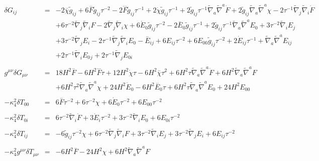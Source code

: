 \documentclass[10pt,letterpaper]{article}
\numberwithin{equation}{section}
\begin{document}
\begin{eqnarray}
\\  \nonumber\\ 
\delta G_{ij}&=& -2 \overset{..}{\chi} \tilde{g}_{ij} + 6 \overset{..}{F} \tilde{g}_{ij} \tau^{-2} - 2 \overset{...}{F} \tilde{g}_{ij} \tau^{-1} + 2 \dot{\chi} \tilde{g}_{ij} \tau^{-1} + 2 \tilde{g}_{ij} \tau^{-1} \tilde{\nabla}_{a}\tilde{\nabla}^{a}\dot{F} + 2 \tilde{g}_{ij} \tilde{\nabla}_{a}\tilde{\nabla}^{a}\chi - 2 \tau^{-1} \tilde{\nabla}_{j}\tilde{\nabla}_{i}\dot{F} \nonumber \\ 
&& + 6 \tau^{-2} \tilde{\nabla}_{j}\tilde{\nabla}_{i}F - 2 \tilde{\nabla}_{j}\tilde{\nabla}_{i}\chi +6 \dot{E}_{0}{} \tilde{g}_{ij} \tau^{-2} - 2 \overset{..}{E}_{0}{} \tilde{g}_{ij} \tau^{-1} + 2 \tilde{g}_{ij} \tau^{-1} \tilde{\nabla}_{a}\tilde{\nabla}^{a}E_{0}{} + 3 \tau^{-2} \tilde{\nabla}_{i}E_{j} \nonumber \\ 
&& + 3 \tau^{-2} \tilde{\nabla}_{j}E_{i} - 2 \tau^{-1} \tilde{\nabla}_{j}\tilde{\nabla}_{i}E_{0}{}- \overset{..}{E}_{ij} + 6 E_{ij} \tau^{-2} + 6 E_{00}{} \tilde{g}_{ij} \tau^{-2} + 2 \dot{E}_{ij} \tau^{-1} + \tilde{\nabla}_{a}\tilde{\nabla}^{a}E_{ij} \nonumber \\ 
&& + 2 \tau^{-1} \tilde{\nabla}_{i}E_{0}{}_{j} + 2 \tau^{-1} \tilde{\nabla}_{j}E_{0i}{}
\\ \nonumber\\
g^{\mu\nu}\delta G_{\mu\nu} &=& 18 H^2 \overset{..}{F} - 6 H^2 \overset{...}{F} \tau + 12 H^2 \dot{\chi} \tau - 6 H^2 \overset{..}{\chi} \tau^2 + 6 H^2 \tau \tilde{\nabla}_{a}\tilde{\nabla}^{a}\dot{F} + 6 H^2 \tilde{\nabla}_{a}\tilde{\nabla}^{a}F \nonumber \\ 
&& + 6 H^2 \tau^2 \tilde{\nabla}_{a}\tilde{\nabla}^{a}\chi +24 H^2 \dot{E}_{0}{} - 6 H^2 \overset{..}{E}_{0}{} \tau + 6 H^2 \tau \tilde{\nabla}_{a}\tilde{\nabla}^{a}E_{0}{}+24 H^2 E_{00}{}
\\ \nonumber\\
-\kappa^2_4 \delta T_{00}&=& 6 \overset{..}{F} \tau^{-2} + 6 \tau^{-2} \chi +6 \dot{E}_{0}{} \tau^{-2}+6 E_{00}{} \tau^{-2}
\\  \nonumber\\ 
-\kappa^2_4\delta T_{0i}&=& 6 \tau^{-2} \tilde{\nabla}_{i}\dot{F}+3 \dot{E}_{i} \tau^{-2} + 3 \tau^{-2} \tilde{\nabla}_{i}E_{0}{}+6 E_{0i}{} \tau^{-2}
\\  \nonumber\\ 
-\kappa^2_4\delta T_{ij}&=& -6 \tilde{g}_{ij} \tau^{-2} \chi + 6 \tau^{-2} \tilde{\nabla}_{j}\tilde{\nabla}_{i}F+3 \tau^{-2} \tilde{\nabla}_{i}E_{j} + 3 \tau^{-2} \tilde{\nabla}_{j}E_{i}+6 E_{ij} \tau^{-2}
\\ \nonumber\\
-\kappa^2_4 g^{\mu\nu}\delta T_{\mu\nu} &=& -6 H^2 \overset{..}{F} - 24 H^2 \chi + 6 H^2 \tilde{\nabla}_{a}\tilde{\nabla}^{a}F
\end{eqnarray}
%
%
%
\\ \\
\end{document}
